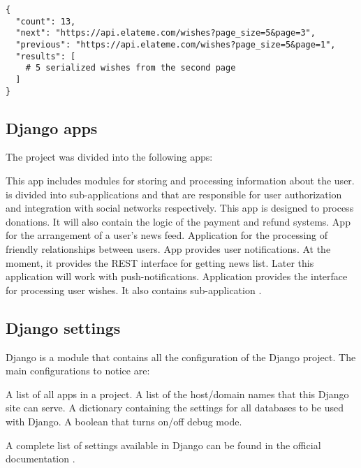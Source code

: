 \begin{lstlisting}
{
  "count": 13,
  "next": "https://api.elateme.com/wishes?page_size=5&page=3",
  "previous": "https://api.elateme.com/wishes?page_size=5&page=1",
  "results": [
    # 5 serialized wishes from the second page
  ]
}
\end{lstlisting}


\subsection{Django apps}
The project was divided into the following apps:

\begin{itemize}

 This app includes modules for storing and processing information about the user.  is divided into sub-applications  and  that are responsible for user authorization and integration with social networks respectively.  This app is designed to process donations. It will also contain the logic of the payment and refund systems.
 App for the arrangement of a user's news feed.
 Application for the processing of friendly relationships between users.
 App provides user notifications. At the moment, it provides the REST interface for getting news list. Later this application will work with push-notifications.
 Application provides the interface for processing user wishes. It also contains sub-application .

\end{itemize}

\subsection{Django settings}
Django  is a module that contains all the configuration of the Django project. The main configurations to notice are:

\begin{itemize}
     A list of all apps in a project.
     A list of the host/domain names that this Django site can serve.
     A dictionary containing the settings for all databases to be used with Django.
     A boolean that turns on/off debug mode.
\end{itemize}

A complete list of settings available in Django can be found in the official documentation \cite{djangosettings}.

